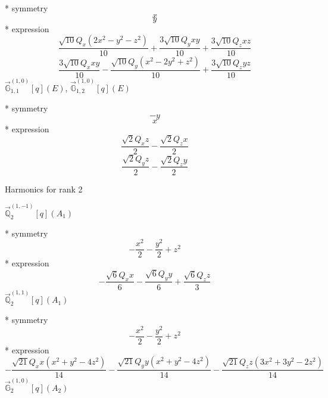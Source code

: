 \documentclass[fleqn,8pt]{jsarticle}
\begin{document}
\noindent\quad ** symmetry
\begin{dmath*}
x
\end{dmath*}
\begin{dmath*}
y
\end{dmath*}
\noindent\quad ** expression
\begin{dmath*}
\frac{\sqrt{10} Q_{x} \left(2 x^{2} - y^{2} - z^{2}\right)}{10} + \frac{3 \sqrt{10} Q_{y} x y}{10} + \frac{3 \sqrt{10} Q_{z} x z}{10}
\end{dmath*}
\begin{dmath*}
\frac{3 \sqrt{10} Q_{x} x y}{10} - \frac{\sqrt{10} Q_{y} \left(x^{2} - 2 y^{2} + z^{2}\right)}{10} + \frac{3 \sqrt{10} Q_{z} y z}{10}
\end{dmath*}
\noindent\quad $\vec{\mathbb{G}}_{1,1}^{(1,0)}[q](E)$, $\vec{\mathbb{G}}_{1,2}^{(1,0)}[q](E)$

\noindent\quad ** symmetry
\begin{dmath*}
- y
\end{dmath*}
\begin{dmath*}
x
\end{dmath*}
\noindent\quad ** expression
\begin{dmath*}
\frac{\sqrt{2} Q_{x} z}{2} - \frac{\sqrt{2} Q_{z} x}{2}
\end{dmath*}
\begin{dmath*}
\frac{\sqrt{2} Q_{y} z}{2} - \frac{\sqrt{2} Q_{z} y}{2}
\end{dmath*}

\noindent * Harmonics for rank 2

\noindent\quad $\vec{\mathbb{Q}}_{2}^{(1,-1)}[q](A_{1})$

\noindent\quad ** symmetry
\begin{dmath*}
- \frac{x^{2}}{2} - \frac{y^{2}}{2} + z^{2}
\end{dmath*}
\noindent\quad ** expression
\begin{dmath*}
- \frac{\sqrt{6} Q_{x} x}{6} - \frac{\sqrt{6} Q_{y} y}{6} + \frac{\sqrt{6} Q_{z} z}{3}
\end{dmath*}
\noindent\quad $\vec{\mathbb{Q}}_{2}^{(1,1)}[q](A_{1})$

\noindent\quad ** symmetry
\begin{dmath*}
- \frac{x^{2}}{2} - \frac{y^{2}}{2} + z^{2}
\end{dmath*}
\noindent\quad ** expression
\begin{dmath*}
- \frac{\sqrt{21} Q_{x} x \left(x^{2} + y^{2} - 4 z^{2}\right)}{14} - \frac{\sqrt{21} Q_{y} y \left(x^{2} + y^{2} - 4 z^{2}\right)}{14} - \frac{\sqrt{21} Q_{z} z \left(3 x^{2} + 3 y^{2} - 2 z^{2}\right)}{14}
\end{dmath*}
\noindent\quad $\vec{\mathbb{G}}_{2}^{(1,0)}[q](A_{2})$
\end{document}
